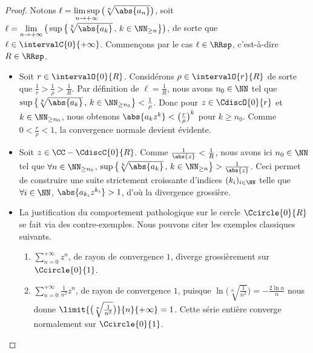 \begin{proof}
    Notons 
    $\displaystyle \ell
    = \limsup_{n \to +\infty} \big( \sqrt[n]{\abs{a_n}} \big)$,
    soit
    $\displaystyle \ell
    = \lim_{n \to +\infty} \big( \sup \big\{ \sqrt[k]{\abs{a_k}} \,,\, k \in \NN_{\geq n} \big\} \big)$,
    de sorte que $\ell \in \intervalC{0}{+\infty}$.
    Commençons par le cas $\ell \in \RRsp$, c'est-à-dire $R \in \RRsp$.
    \begin{itemize}
        \item Soit $r \in \intervalO{0}{R}$.
        Considérons $\rho  \in \intervalO{r}{R}$ de sorte que $\frac1r > \frac{1}{\rho} > \frac1R$.
        Par définition de $\ell = \frac1R$,
        nous avons $n_0 \in \NN$ tel que
        $\sup \big\{ \sqrt[k]{\abs{a_k}} \,,\, k \in \NN_{\geq n_0} \big\} < \frac{1}{\rho}$.
        Donc pour $z \in \CdiscO{0}{r}$ et $k \in \NN_{\geq n_0}$, nous obtenons
        $\abs{a_k z^k} < \big( \frac{r}{\rho} \big)^k$ pour $k \geq n_0$.
        Comme $0 < \frac{r}{\rho} < 1$, la convergence normale devient évidente.


        \item Soit $z \in \CC - \CdiscC{0}{R}$.
        Comme $\frac{1}{\abs{z}} < \frac{1}{R}$, nous avons ici $n_0 \in \NN$ tel que
        $\forall n \in \NN_{\geq n_0}$,
        $\sup \big\{ \sqrt[k]{\abs{a_k}} \,,\, k \in \NN_{\geq n} \big\} > \frac{1}{\abs{z}}$.
        Ceci permet de construire une suite strictement croissante d'indices $(k_i)_{i \in \NN}$
        telle que
        $\forall i \in \NN$, $\abs{a_{k_i} z^{k_i}} > 1$,
        d'où la divergence grossière.


        \item La justification du comportement pathologique sur le cercle $\Ccircle{0}{R}$ se fait via des contre-exemples. Nous pouvons citer les exemples classiques suivants.
        \begin{enumerate}[label=(\alph*)]
	        \item $\sum_{n=0}^{+\infty} z^n$, 
	        de rayon de convergence $1$, 
	        diverge grossièrement sur $\Ccircle{0}{1}$.

	        \item $\sum_{n=0}^{+\infty} \frac{1}{n^2} z^n$, 
	        de rayon de convergence $1$,
	        puisque 
	        $ \ln \big( \sqrt[n]{\frac{1}{n^2}} \big)
	        = -\frac{2 \ln n}{n}$
	        nous donne
	        $ \limit{\big( \sqrt[n]{\frac{1}{n^2}} \big)}%
	                {n}{+\infty}
	        = 1$.
	        Cette série entière converge normalement sur $\Ccircle{0}{1}$.


\end{enumerate}
\end{itemize}
\end{proof}
